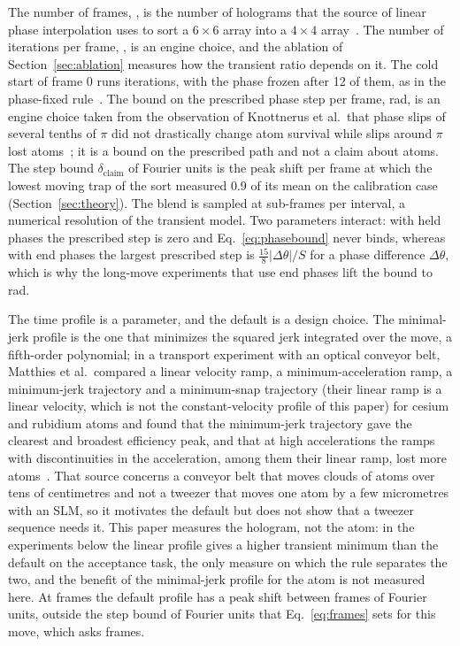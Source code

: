 The number of frames, \parFrames{}, is the number of holograms that the source of linear phase interpolation uses to sort a $6\times6$ array into a $4\times4$ array~\cite{lpi}. The number of iterations per frame, \parFrameIters{}, is an engine choice, and the ablation of Section~\ref{sec:ablation} measures how the transient ratio depends on it. The cold start of frame 0 runs \setupCold{} iterations, with the phase frozen after 12 of them, as in the phase-fixed rule~\cite{kimol}. The bound on the prescribed phase step per frame, \parPhaseVel{} rad, is an engine choice taken from the observation of Knottnerus et al.\ that phase slips of several tenths of $\pi$ did not drastically change atom survival while slips around $\pi$ lost atoms~\cite{lpi}; it is a bound on the prescribed path and not a claim about atoms. The step bound $\delta_{\mathrm{claim}}$ of \claimStepFu{} Fourier units is the peak shift per frame at which the lowest moving trap of the sort measured 0.9 of its mean on the calibration case (Section~\ref{sec:theory}). The blend is sampled at \parSubsteps{} sub-frames per interval, a numerical resolution of the transient model. Two parameters interact: with held phases the prescribed step is zero and Eq.~\ref{eq:phasebound} never binds, whereas with end phases the largest prescribed step is $\tfrac{15}{8}|\Delta\theta|/S$ for a phase difference $\Delta\theta$, which is why the long-move experiments that use end phases lift the bound to \scopePhaseVel{} rad.

The time profile is a parameter, and the default is a design choice. The minimal-jerk profile is the one that minimizes the squared jerk integrated over the move, a fifth-order polynomial; in a transport experiment with an optical conveyor belt, Matthies et al.\ compared a linear velocity ramp, a minimum-acceleration ramp, a minimum-jerk trajectory and a minimum-snap trajectory (their linear ramp is a linear velocity, which is not the constant-velocity profile of this paper) for cesium and rubidium atoms and found that the minimum-jerk trajectory gave the clearest and broadest efficiency peak, and that at high accelerations the ramps with discontinuities in the acceleration, among them their linear ramp, lost more atoms~\cite{matthies}. That source concerns a conveyor belt that moves clouds of atoms over tens of centimetres and not a tweezer that moves one atom by a few micrometres with an SLM, so it motivates the default but does not show that a tweezer sequence needs it. This paper measures the hologram, not the atom: in the experiments below the linear profile gives a higher transient minimum than the default on the acceptance task, the only measure on which the rule separates the two, and the benefit of the minimal-jerk profile for the atom is not measured here. At \parFrames{} frames the default profile has a peak shift between frames of \accPeakStep{} Fourier units, outside the step bound of \claimStepFu{} Fourier units that Eq.~\ref{eq:frames} sets for this move, which asks \accFramesForMove{} frames.


